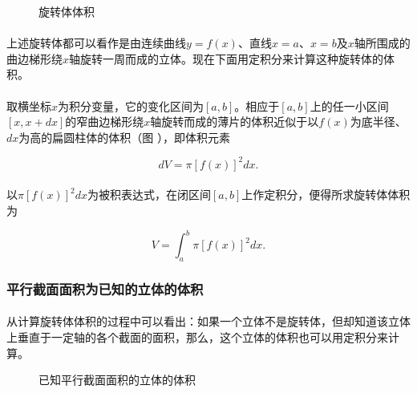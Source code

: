 \begin{figure}[H]
\centering
  
  \caption{旋转体体积}
  \label{旋转体体积}
\end{figure}

\paragraph{}
上述旋转体都可以看作是由连续曲线$y=f(x)$、直线$x=a$、$x=b$及$x$轴所围成的曲边梯形绕$x$轴旋转一周而成的立体。现在下面用定积分来计算这种旋转体的体积。

\paragraph{}
取横坐标$x$为积分变量，它的变化区间为$[a,b]$。相应于$[a,b]$上的任一小区间$[x,x+dx]$的窄曲边梯形绕$x$轴旋转而成的薄片的体积近似于以$f(x)$为底半径、$dx$为高的扁圆柱体的体积（图 ），即体积元素

\begin{equation}
  dV = \pi[f(x)]^2dx.
\end{equation}

\paragraph{}
以$\pi[f(x)]^2dx$为被积表达式，在闭区间$[a,b]$上作定积分，便得所求旋转体体积为

\begin{equation}
  V = \int_a^b\pi[f(x)]^2dx.
\end{equation}

\subsubsection{平行截面面积为已知的立体的体积}
\paragraph{}
从计算旋转体体积的过程中可以看出：如果一个立体不是旋转体，但却知道该立体上垂直于一定轴的各个截面的面积，那么，这个立体的体积也可以用定积分来计算。

\begin{figure}[H]
\centering
  
  \caption{已知平行截面面积的立体的体积}
  \label{已知平行截面面积的立体的体积}
\end{figure}

